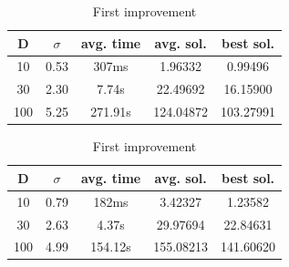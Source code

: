 \documentclass{article}
\begin{document}
\begin{table}[htbp]
\begin{minipage}{.4\linewidth}
    \centering
    
    \begin{tabular}{|c|c|c|c|c|}
    \hline
    D   & $\sigma$  & avg. time     & avg. sol.     & best sol.\\
    \hline
    10  & 0.53      & 307ms         & 1.96332       & 0.99496 \\
    \hline
    30  & 2.30      & 7.74s         & 22.49692      & 16.15900 \\
    \hline
    100 & 5.25      & 271.91s       & 124.04872     & 103.27991 \\
    \hline
    \end{tabular}
    \caption{Best improvement}
  \end{minipage}%
  \quad %
  \begin{minipage}{.75\linewidth}
    \centering
    
    \begin{tabular}{|c|c|c|c|c|}
    \hline
    D   & $\sigma$  & avg. time     & avg. sol.     & best sol. \\
    \hline
    10  & 0.79      & 182ms         & 3.42327       & 1.23582 \\
    \hline
    30  & 2.63      & 4.37s         & 29.97694      & 22.84631 \\
    \hline
    100 & 4.99      & 154.12s       & 155.08213     & 141.60620 \\
    \hline
    \end{tabular}
    \caption{First improvement}
  \end{minipage}
\end{table}
\end{document}

